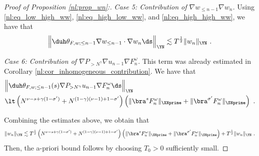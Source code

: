 \documentclass[11pt]{article}
\begin{document}
\begin{proof}[Proof of Proposition \ref{nl:prop_wn}:]
\emph{Case 5: Contribution of \(  \nabla w_{\leq n-1} \nabla w_n\).} Using \eqref{nl:eq_low_high_ww}, \eqref{nl:eq_high_low_ww}, and \eqref{nl:eq_high_high_ww}, we have that
\begin{equation*}
\Big \| \duh \theta_{F,w;\leq n-1} \nabla w_{\leq n-1} \cdot \nabla w_n \ds \Big \|_{\YN} 
\lesssim T^{\frac{1}{2}} 
 \| w_n \|_{\YN} ~. 
\end{equation*}

\emph{Case 6: Contribution of \( \nabla P_{>N^\gamma} \nabla u_{n-1} \nabla F_n^\omega\).} This term was already estimated in Corollary \ref{nl:cor_inhomogeneous_contribution}. We have that
\begin{align*}
&\Big \| \duh \theta_{F,w;\leq n-1}(s) \nabla P_{>N^\gamma} u_{n-1} \nabla F_n^\omega \ds \Big \|_{\YN} \\
&\lt \left( N^{\nu-s+\gamma(1-\sigma^\prime)} + N^{(1-\gamma) (\nu-1)+1-\sigma^\prime} \right) \left( \| \bra^s F_n^\omega \|_{\XNprime} + \| \bra^{\sigma^\prime} F_n^\omega \|_{\SNprime} \right)~. 
\end{align*}

Combining the estimates above, we obtain that 
\begin{equation*}
\| w_n \|_{\YN} \lesssim T^{\frac{1}{2}} \left( N^{\nu-s+\gamma(1-\sigma^\prime)} + N^{(1-\gamma) (\nu-1)+1-\sigma^\prime} \right) \left( \| \bra^s F_n^\omega \|_{\XNprime} + \| \bra^{\sigma^\prime} F_n^\omega \|_{\SNprime} \right) + T^{\frac{1}{2}} \| w_n \|_{\YN}~. 
\end{equation*}
Then, the a-priori bound follows by choosing \( T_0 >0 \) sufficiently small. 

\end{proof}
\end{document}

